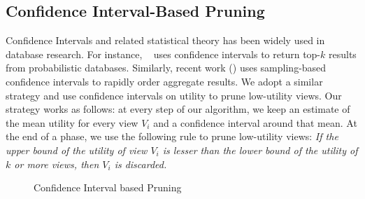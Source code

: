 \subsection{Confidence Interval-Based Pruning}
\label{sec:confidence_interval}
Confidence Intervals and related statistical theory has been widely used in database
research. 
For instance, ~\cite{DBLP:conf/ICDE/ReDS07} uses confidence intervals to
return top-$k$ results from probabilistic databases.
Similarly, recent work (\cite{DBLP:journals/corr/KimBPIMR14}) uses sampling-based confidence
intervals to rapidly order aggregate results.
We adopt a similar strategy and use confidence intervals on utility to prune low-utility views.
Our strategy works as follows: at every step of our
algorithm, we keep an estimate of the mean utility for every view $V_i$ and a
confidence interval around that mean.
At the end of a phase, we use the following rule to prune low-utility
views:
{\em If the upper bound of the utility of view $V_i$ is lesser
than the lower bound of the utility of $k$ or more views, then $V_i$ is discarded.}

\begin{figure}[h]
\vspace{-10pt}
\centerline{
\hbox{}}
\vspace{-20pt}
\caption{Confidence Interval based Pruning}
\label{fig:conf_interval}
\vspace{-15pt}
\end{figure}


